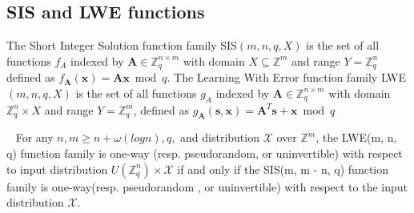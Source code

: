 \documentclass[a4paper]{article}
\theoremstyle{definition}
\theoremstyle{remark}
\begin{document}
\subsection{SIS and LWE functions}
The Short Integer Solution function family SIS$(m,n,q,X)$ is the set of all functions $f_{A}$ indexed 
by $\mathbf{A} \in \mathbb{Z}_{q}^{n \times m}$ with domain $X \subseteq \mathbb{Z}^{m}$ and range 
$Y=\mathbb{Z}_{q}^{n}$ defined as $f_{\mathbf{A}}(\mathbf{x})=\mathbf{A} \mathbf{x} \bmod q$. The 
Learning With Error function family LWE$(m,n,q,X)$ is the set of all functions $g_{A}$ indexed by 
$\mathbf{A} \in \mathbb{Z}_{q}^{n \times m}$ with domain $\mathbb{Z}_{q}^{n} \times X$ and range 
$Y=\mathbb{Z}_{q}^{m}$, defined as $g_{\mathbf{A}}(\mathbf{s}, \mathbf{x})=\mathbf{A}^{T} \mathbf{s}+\mathbf{x} \bmod q$

\begin{theorem}~\cite{micciancio2011pseudorandom}
  \label{thm:sislwe}
    For any $n, m \ge n + \omega(log n), q,$ and distribution $\mathcal{X}$ over $\mathbb{Z}^{m}$, the LWE(m, n, q) function 
    family is one-way (resp. pseudorandom, or uninvertible) with respect to input distribution
     $U(\mathbb{Z}_{q}^{n}) \times \mathcal{X}$ if and only if the SIS(m, m - n, q) function family is one-way(resp. pseudorandom
     , or uninvertible) with respect to the input distribution $\mathcal{X}$.

\end{theorem}
%
\end{document}
